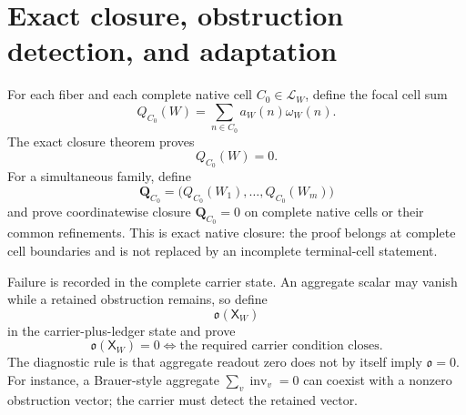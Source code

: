 \documentclass[11pt]{article}
\theoremstyle{definition}
\begin{document}

\section{Exact closure, obstruction detection, and adaptation}\label{sec:closure-obstruction-adaptation}

For each fiber and each complete native cell \(C_0\in\mathcal L_W\), define
the focal cell sum
\[
Q_{C_0}(W)=
\sum_{n\in C_0}a_W(n)\omega_W(n).
\]
The exact closure theorem proves
\[
Q_{C_0}(W)=0.
\]
For a simultaneous family, define
\[
\mathbf Q_{C_0}=
\bigl(Q_{C_0}(W_1),\ldots,Q_{C_0}(W_m)\bigr)
\]
and prove coordinatewise closure \(\mathbf Q_{C_0}=0\) on complete native
cells or their common refinements.  This is exact native closure: the proof
belongs at complete cell boundaries and is not replaced by an incomplete
terminal-cell statement.

Failure is recorded in the complete carrier state.  An aggregate scalar may
vanish while a retained obstruction remains, so define
\[
\mathfrak o(\mathsf X_W)
\]
in the carrier-plus-ledger state and prove
\[
\mathfrak o(\mathsf X_W)=0
\iff
\text{the required carrier condition closes}.
\]
The diagnostic rule is that aggregate readout zero does not by itself imply
\(\mathfrak o=0\).  For instance, a Brauer-style aggregate
\(\sum_v\operatorname{inv}_v=0\) can coexist with a nonzero obstruction vector;
the carrier must detect the retained vector.
\end{document}

